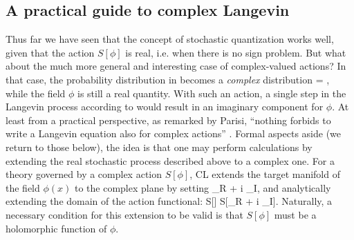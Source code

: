 \documentclass[../main.tex]{subfiles}
\begin{document}
\subsection{A practical guide to complex Langevin}

Thus far we have seen that the concept of stochastic quantization works well, given that the action $S[\phi]$ is real, i.e. when there is no sign problem. But what about the much more general and interesting case of complex-valued actions? In that case, the probability distribution in  becomes a {\it complex} distribution
%
\beq
  \label{Eq:complex_p}
\rho[\phi] = ,
\eeq
%
while the field $\phi$ is still a real quantity. With such an action, a single step in the Langevin process according to  would result in an imaginary component for $\phi$. At least from a practical perspective, as remarked by Parisi, ``nothing forbids to write a Langevin equation also for complex actions'' \cite{ParisiWu}.
Formal aspects aside (we return to those below), the idea is that one may perform calculations by extending the real stochastic process described above to a complex one. For a theory governed by a complex action $S[\phi]$, CL extends the target manifold of the field $\phi(x)$ to the complex plane by setting
%
\beq
  \phi \to \phi_{R} + i \phi_{I},
\eeq
%
and analytically extending the domain of the action functional:
%
\beq
S[\phi] \to S[\phi_{R} + i \phi_{I}].
\eeq
%
Naturally, a necessary condition for this extension to be valid is that $S[\phi]$ must be a holomorphic function of $\phi$.
\end{document}
